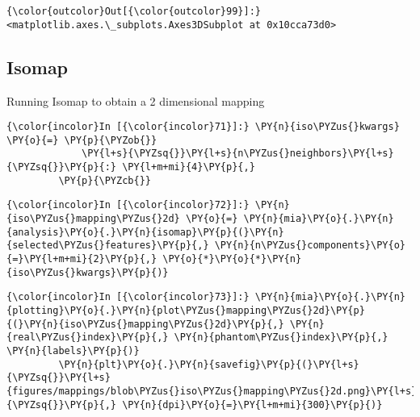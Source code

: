             \begin{Verbatim}[commandchars=\\\{\}]
{\color{outcolor}Out[{\color{outcolor}99}]:} <matplotlib.axes.\_subplots.Axes3DSubplot at 0x10cca73d0>
\end{Verbatim}

    \subsection{Isomap}\label{isomap}

Running Isomap to obtain a 2 dimensional mapping

    \begin{Verbatim}[commandchars=\\\{\}]
{\color{incolor}In [{\color{incolor}71}]:} \PY{n}{iso\PYZus{}kwargs} \PY{o}{=} \PY{p}{\PYZob{}}
             \PY{l+s}{\PYZsq{}}\PY{l+s}{n\PYZus{}neighbors}\PY{l+s}{\PYZsq{}}\PY{p}{:} \PY{l+m+mi}{4}\PY{p}{,}
         \PY{p}{\PYZcb{}}
\end{Verbatim}

    \begin{Verbatim}[commandchars=\\\{\}]
{\color{incolor}In [{\color{incolor}72}]:} \PY{n}{iso\PYZus{}mapping\PYZus{}2d} \PY{o}{=} \PY{n}{mia}\PY{o}{.}\PY{n}{analysis}\PY{o}{.}\PY{n}{isomap}\PY{p}{(}\PY{n}{selected\PYZus{}features}\PY{p}{,} \PY{n}{n\PYZus{}components}\PY{o}{=}\PY{l+m+mi}{2}\PY{p}{,} \PY{o}{*}\PY{o}{*}\PY{n}{iso\PYZus{}kwargs}\PY{p}{)}
\end{Verbatim}

    \begin{Verbatim}[commandchars=\\\{\}]
{\color{incolor}In [{\color{incolor}73}]:} \PY{n}{mia}\PY{o}{.}\PY{n}{plotting}\PY{o}{.}\PY{n}{plot\PYZus{}mapping\PYZus{}2d}\PY{p}{(}\PY{n}{iso\PYZus{}mapping\PYZus{}2d}\PY{p}{,} \PY{n}{real\PYZus{}index}\PY{p}{,} \PY{n}{phantom\PYZus{}index}\PY{p}{,} \PY{n}{labels}\PY{p}{)}
         \PY{n}{plt}\PY{o}{.}\PY{n}{savefig}\PY{p}{(}\PY{l+s}{\PYZsq{}}\PY{l+s}{figures/mappings/blob\PYZus{}iso\PYZus{}mapping\PYZus{}2d.png}\PY{l+s}{\PYZsq{}}\PY{p}{,} \PY{n}{dpi}\PY{o}{=}\PY{l+m+mi}{300}\PY{p}{)}
\end{Verbatim}

    \begin{center}
    \end{center}
    { \hspace*{\fill} \\}

